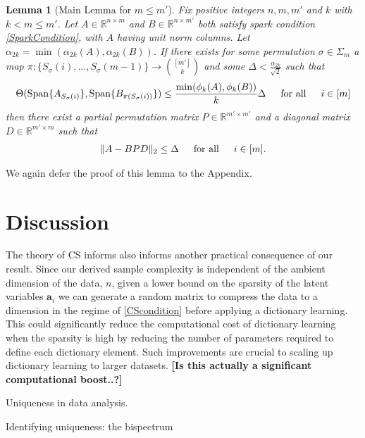 \documentclass[journal, onecolumn]{IEEEtran}
\newtheorem{lemma}{Lemma}
\begin{document}
\begin{lemma}[Main Lemma for $m \leq m'$]\label{MainLemma2}
Fix positive integers $n, m, m'$ and $k$ with $k < m \leq m'$. Let $A \in \mathbb{R}^{n \times m}$ and $B \in \mathbb{R}^{n \times m'}$ both satisfy spark condition \eqref{SparkCondition}, with $A$ having unit norm columns. Let $\alpha_{2k} = \min(\alpha_{2k}(A), \alpha_{2k}(B))$.  If there exists for some permutation $\sigma \in \Sigma_m$ a map $\pi: \{S_{\sigma}(i), \ldots, S_{\sigma}(m-1)\} \to {[m'] \choose k}$ and some $\Delta < \frac{\alpha_{2k}}{\sqrt{2}}$ such that 
\begin{equation}\label{GapUpperBound2}
\Theta(\text{Span}\{A_{S_\sigma(i)}\}, \text{Span}\{B_{\pi(S_\sigma(i))}\}) \leq \frac{ \min(\phi_k(A), \phi_k(B)) }{k} \Delta \indent \text{for all} \indent i \in [m]
\end{equation}
%
then there exist a partial permutation matrix $P \in \mathbb{R}^{m' \times m'}$ and a diagonal matrix $D \in \mathbb{R}^{m' \times m}$ such that
\begin{align}
\|A - BPD\|_2 \leq \Delta \indent \text{for all} \indent i \in [m].
\end{align}
\end{lemma}

We again defer the proof of this lemma to the Appendix.


\section{Discussion}

The theory of CS informs also informs another practical consequence of our result. Since our derived sample complexity is independent of the ambient dimension of the data, $n$, given a lower bound on the sparsity of the latent variables $\mathbf{a}_i$ we can generate a random matrix to compress the data to a dimension in the regime of \eqref{CScondition} before applying a dictionary learning. This could significantly reduce the computational cost of dictionary learning when the sparsity is high by reducing the number of parameters required to define each dictionary element. Such improvements are crucial to scaling up dictionary learning to larger datasets. \textbf{[Is this actually a significant computational boost..?]}

Uniqueness in data analysis.

Identifying uniqueness: the bispectrum
\end{document}
